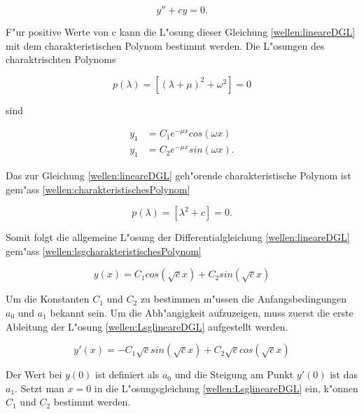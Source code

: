 \begin{refsection}
\begin{equation}
	y''+ cy = 0.
	\label{wellen:lineareDGL}
\end{equation}


F"ur positive Werte von c kann die L"osung dieser Gleichung 
\ref{wellen:lineareDGL} mit dem charakteristischen Polynom bestimmt werden. 
Die L"osungen des charaktrischten Polynoms

\begin{equation}
	p(\lambda) = [(\lambda+\mu)^2+\omega^2] =0
	\label{wellen:charakteristischesPolynom}
\end{equation}

sind

\begin{equation}
	\begin{split}
	y_1 &= C_1e^{-\mu x}cos(\omega x) \\
	y_1 &= C_2e^{-\mu x}sin(\omega x).
	\end{split}
	\label{wellen:lsgcharakteristischesPolynom}
\end{equation}

Das zur Gleichung \ref{wellen:lineareDGL} geh"orende charakteristische Polynom 
ist gem"ass \ref{wellen:charakteristischesPolynom}

\begin{equation*}
	p(\lambda) = [\lambda^2 + c] =0.
\end{equation*}

Somit folgt die allgemeine L"osung der Differentialgleichung 
\ref{wellen:lineareDGL} gem"ass \ref{wellen:lsgcharakteristischesPolynom}

\begin{equation}
	y(x) = C_1 cos(\sqrt{c}x) + C_2 sin(\sqrt{c}x)
	\label{wellen:LsglineareDGL}
\end{equation}

Um die Konstanten $C_1$ und $C_2$ zu bestimmen m"ussen die Anfangsbedingungen 
$a_0$ und $a_1$ bekannt sein. Um die Abh"angigkeit aufzuzeigen, muss zuerst die 
erste Ableitung der L"osung \ref{wellen:LsglineareDGL} aufgestellt werden.

\begin{equation}
	y'(x)=-C_1 \sqrt{c} sin(\sqrt{c}x) + C_2 \sqrt{c} cos(\sqrt{c}x)
\end{equation}

Der Wert bei $y(0)$ ist definiert als $a_0$ und die Steigung am Punkt $y'(0)$ 
ist das $a_1$. Setzt man $x=0$ in die L"osungsgleichung 
\ref{wellen:LsglineareDGL} ein, k"onnen $C_1$ und $C_2$ bestimmt werden.


\end{refsection}

